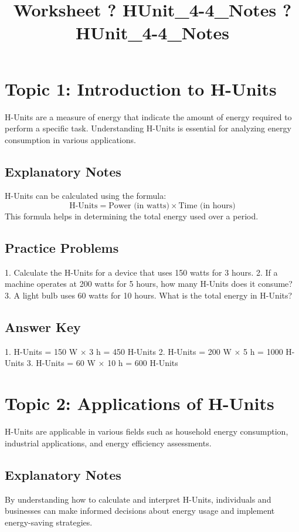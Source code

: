 \documentclass{article}
\title{Worksheet ? HUnit\_4-4\_Notes ? HUnit\_4-4\_Notes}
\author{}
\date{}
\begin{document}
\maketitle

\section*{Topic 1: Introduction to H-Units}
H-Units are a measure of energy that indicate the amount of energy required to perform a specific task. Understanding H-Units is essential for analyzing energy consumption in various applications.

\subsection*{Explanatory Notes}
H-Units can be calculated using the formula:
\[
\text{H-Units} = \text{Power (in watts)} \times \text{Time (in hours)}
\]
This formula helps in determining the total energy used over a period.

\subsection*{Practice Problems}
1. Calculate the H-Units for a device that uses 150 watts for 3 hours.
2. If a machine operates at 200 watts for 5 hours, how many H-Units does it consume?
3. A light bulb uses 60 watts for 10 hours. What is the total energy in H-Units?

\subsection*{Answer Key}
1. H-Units = 150 W $\times$ 3 h = 450 H-Units
2. H-Units = 200 W $\times$ 5 h = 1000 H-Units
3. H-Units = 60 W $\times$ 10 h = 600 H-Units

\section*{Topic 2: Applications of H-Units}
H-Units are applicable in various fields such as household energy consumption, industrial applications, and energy efficiency assessments.

\subsection*{Explanatory Notes}
By understanding how to calculate and interpret H-Units, individuals and businesses can make informed decisions about energy usage and implement energy-saving strategies.
\end{document}
